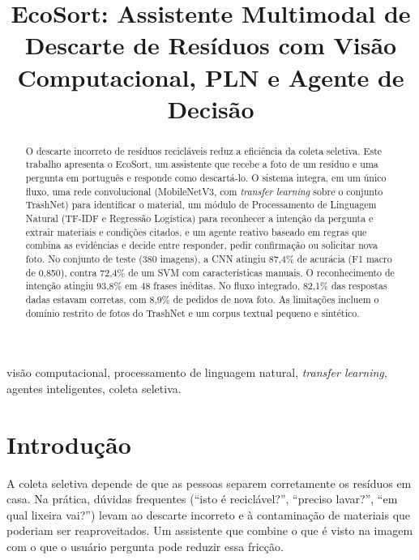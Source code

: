\documentclass[conference]{IEEEtran}
\begin{document}
\title{EcoSort: Assistente Multimodal de Descarte de Res\'iduos com Vis\~ao Computacional, PLN e Agente de Decis\~ao}

\author{
}

\maketitle

\begin{abstract}
O descarte incorreto de res\'iduos recicl\'aveis reduz a efici\^encia da coleta seletiva. Este trabalho apresenta o EcoSort, um assistente que recebe a foto de um res\'iduo e uma pergunta em portugu\^es e responde como descart\'a-lo. O sistema integra, em um \'unico fluxo, uma rede convolucional (MobileNetV3, com \emph{transfer learning} sobre o conjunto TrashNet) para identificar o material, um m\'odulo de Processamento de Linguagem Natural (TF-IDF e Regress\~ao Log\'istica) para reconhecer a inten\c{c}\~ao da pergunta e extrair materiais e condi\c{c}\~oes citados, e um agente reativo baseado em regras que combina as evid\^encias e decide entre responder, pedir confirma\c{c}\~ao ou solicitar nova foto. No conjunto de teste (380 imagens), a CNN atingiu 87,4\% de acur\'acia (F1 macro de 0,850), contra 72,4\% de um SVM com caracter\'isticas manuais. O reconhecimento de inten\c{c}\~ao atingiu 93,8\% em 48 frases in\'editas. No fluxo integrado, 82,1\% das respostas dadas estavam corretas, com 8,9\% de pedidos de nova foto. As limita\c{c}\~oes incluem o dom\'inio restrito de fotos do TrashNet e um corpus textual pequeno e sint\'etico.
\end{abstract}

\begin{IEEEkeywords}
vis\~ao computacional, processamento de linguagem natural, \emph{transfer learning}, agentes inteligentes, coleta seletiva.
\end{IEEEkeywords}

\section{Introdu\c{c}\~ao}
A coleta seletiva depende de que as pessoas separem corretamente os res\'iduos em casa. Na pr\'atica, d\'uvidas frequentes (``isto \'e recicl\'avel?'', ``preciso lavar?'', ``em qual lixeira vai?'') levam ao descarte incorreto e \`a contamina\c{c}\~ao de materiais que poderiam ser reaproveitados. Um assistente que combine o que \'e visto na imagem com o que o usu\'ario pergunta pode reduzir essa fric\c{c}\~ao.
\end{document}
